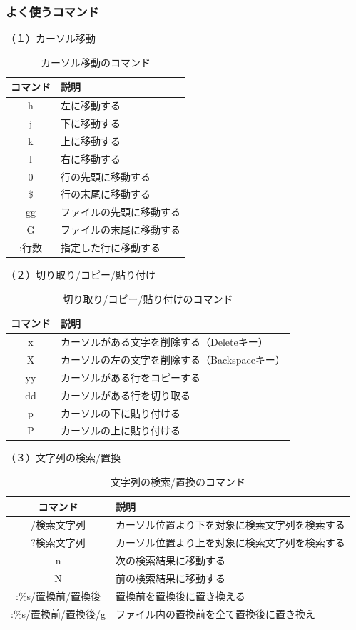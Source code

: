 \documentclass[a4paper, 11pt, dvipdfmx]{jsarticle}
\begin{document}
\subsubsection{よく使うコマンド}
（１）カーソル移動
\begin{table}[H]
  \centering
  \caption{カーソル移動のコマンド}
  \begin{tabular}{|c|l|} \hline
    コマンド & 説明 \\ \hline
    h & 左に移動する \\
    j & 下に移動する \\
    k & 上に移動する \\
    l & 右に移動する \\
    0 & 行の先頭に移動する \\
    \$ & 行の末尾に移動する \\
    gg & ファイルの先頭に移動する \\
    G & ファイルの末尾に移動する \\
    :行数 & 指定した行に移動する \\ \hline
  \end{tabular}
\end{table}
（２）切り取り/コピー/貼り付け
\begin{table}[H]
  \centering
  \caption{切り取り/コピー/貼り付けのコマンド}
  \begin{tabular}{|c|l|} \hline
    コマンド & 説明 \\ \hline
    x & カーソルがある文字を削除する（Deleteキー） \\
    X & カーソルの左の文字を削除する（Backspaceキー） \\
    yy & カーソルがある行をコピーする \\
    dd & カーソルがある行を切り取る \\
    p & カーソルの下に貼り付ける \\
    P & カーソルの上に貼り付ける \\ \hline
  \end{tabular}
\end{table}
（３）文字列の検索/置換
\begin{table}[H]
  \centering
  \caption{文字列の検索/置換のコマンド}
  \begin{tabular}{|c|l|} \hline
    コマンド & 説明 \\ \hline
    /検索文字列 & カーソル位置より下を対象に検索文字列を検索する \\
    ?検索文字列 & カーソル位置より上を対象に検索文字列を検索する \\
    n & 次の検索結果に移動する \\
    N & 前の検索結果に移動する \\
    :\%s/置換前/置換後 & 置換前を置換後に置き換える \\
    :\%s/置換前/置換後/g & ファイル内の置換前を全て置換後に置き換え \\ \hline
  \end{tabular}
\end{table}
\end{document}
